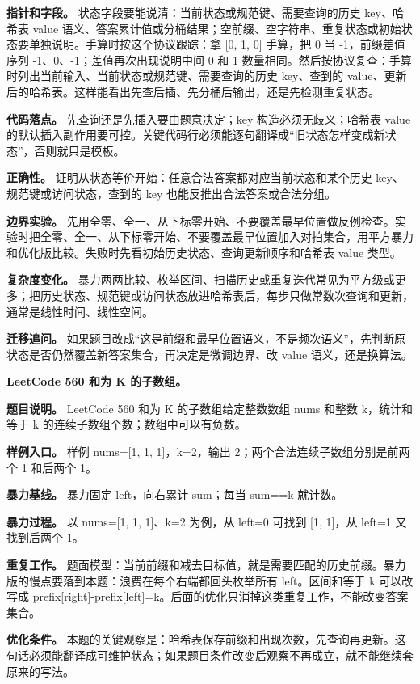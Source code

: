 \textbf{指针和字段。} 状态字段要能说清：当前状态或规范键、需要查询的历史 key、哈希表 value 语义、答案累计值或分桶结果；空前缀、空字符串、重复状态或初始状态要单独说明。手算时按这个协议跟踪：拿 [0, 1, 0] 手算，把 0 当 -1，前缀差值序列 -1、0、-1；差值再次出现说明中间 0 和 1 数量相同。然后按协议复查：手算时列出当前输入、当前状态或规范键、需要查询的历史 key、查到的 value、更新后的哈希表。这样能看出先查后插、先分桶后输出，还是先检测重复状态。

\textbf{代码落点。} 先查询还是先插入要由题意决定；key 构造必须无歧义；哈希表 value 的默认插入副作用要可控。关键代码行必须能逐句翻译成“旧状态怎样变成新状态”，否则就只是模板。

\textbf{正确性。} 证明从状态等价开始：任意合法答案都对应当前状态和某个历史 key、规范键或访问状态，查到的 key 也能反推出合法答案或合法分组。

\textbf{边界实验。} 先用全零、全一、从下标零开始、不要覆盖最早位置做反例检查。实验时把全零、全一、从下标零开始、不要覆盖最早位置加入对拍集合，用平方暴力和优化版比较。失败时先看初始历史状态、查询更新顺序和哈希表 value 类型。

\textbf{复杂度变化。} 暴力两两比较、枚举区间、扫描历史或重复迭代常见为平方级或更多；把历史状态、规范键或访问状态放进哈希表后，每步只做常数次查询和更新，通常是线性时间、线性空间。

\textbf{迁移追问。} 如果题目改成“这是前缀和最早位置语义，不是频次语义”，先判断原状态是否仍然覆盖新答案集合，再决定是微调边界、改 value 语义，还是换算法。

\noindent\textbf{LeetCode 560 和为 K 的子数组。}

\textbf{题目说明。} LeetCode 560 和为 K 的子数组给定整数数组 nums 和整数 k，统计和等于 k 的连续子数组个数；数组中可以有负数。

\textbf{样例入口。} 样例 nums=[1, 1, 1]，k=2，输出 2；两个合法连续子数组分别是前两个 1 和后两个 1。

\textbf{暴力基线。} 暴力固定 left，向右累计 sum；每当 sum==k 就计数。

\textbf{暴力过程。} 以 nums=[1, 1, 1]、k=2 为例，从 left=0 可找到 [1, 1]，从 left=1 又找到后两个 1。

\textbf{重复工作。} 题面模型：当前前缀和减去目标值，就是需要匹配的历史前缀。暴力版的慢点要落到本题：浪费在每个右端都回头枚举所有 left。区间和等于 k 可以改写成 prefix[right]-prefix[left]=k。后面的优化只消掉这类重复工作，不能改变答案集合。

\textbf{优化条件。} 本题的关键观察是：哈希表保存前缀和出现次数，先查询再更新。这句话必须能翻译成可维护状态；如果题目条件改变后观察不再成立，就不能继续套原来的写法。

